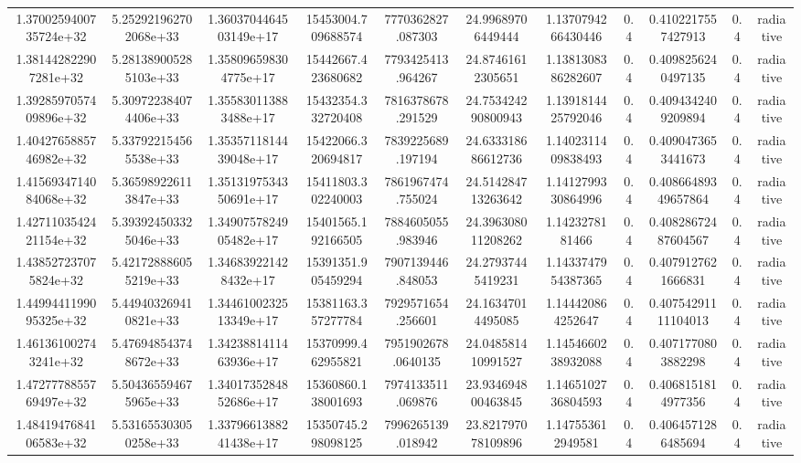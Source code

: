\begin{table}
\begin{tabular}{ccccccccccc}
1.3700259400735724e+32 & 5.252921962702068e+33 & 1.3603704464503149e+17 & 15453004.709688574 & 7770362827.087303 & 24.99689706449444 & 1.1370794266430446 & 0.4 & 0.4102217557427913 & 0.4 & radiative \\
1.381442822907281e+32 & 5.281389005285103e+33 & 1.358096598304775e+17 & 15442667.423680682 & 7793425413.964267 & 24.87461612305651 & 1.1381308386282607 & 0.4 & 0.4098256240497135 & 0.4 & radiative \\
1.3928597057409896e+32 & 5.309722384074406e+33 & 1.355830113883488e+17 & 15432354.332720408 & 7816378678.291529 & 24.753424290800943 & 1.1391814425792046 & 0.4 & 0.4094342409209894 & 0.4 & radiative \\
1.4042765885746982e+32 & 5.337922154565538e+33 & 1.3535711814439048e+17 & 15422066.320694817 & 7839225689.197194 & 24.633318686612736 & 1.1402311409838493 & 0.4 & 0.4090473653441673 & 0.4 & radiative \\
1.4156934714084068e+32 & 5.365989226113847e+33 & 1.3513197534350691e+17 & 15411803.302240003 & 7861967474.755024 & 24.514284713263642 & 1.1412799330864996 & 0.4 & 0.40866489349657864 & 0.4 & radiative \\
1.4271103542421154e+32 & 5.393924503325046e+33 & 1.3490757824905482e+17 & 15401565.192166505 & 7884605055.983946 & 24.396308011208262 & 1.1423278181466 & 0.4 & 0.40828672487604567 & 0.4 & radiative \\
1.438527237075824e+32 & 5.421728886055219e+33 & 1.346839221428432e+17 & 15391351.905459294 & 7907139446.848053 & 24.27937445419231 & 1.1433747954387365 & 0.4 & 0.4079127621666831 & 0.4 & radiative \\
1.4499441199095325e+32 & 5.449403269410821e+33 & 1.3446100232513349e+17 & 15381163.357277784 & 7929571654.256601 & 24.16347014495085 & 1.144420864252647 & 0.4 & 0.40754291111104013 & 0.4 & radiative \\
1.461361002743241e+32 & 5.476948543748672e+33 & 1.3423881411463936e+17 & 15370999.462955821 & 7951902678.0640135 & 24.048581410991527 & 1.1454660238932088 & 0.4 & 0.4071770803882298 & 0.4 & radiative \\
1.4727778855769497e+32 & 5.504365594675965e+33 & 1.3401735284852686e+17 & 15360860.138001693 & 7974133511.069876 & 23.934694800463845 & 1.1465102736804593 & 0.4 & 0.4068151814977356 & 0.4 & radiative \\
1.4841947684106583e+32 & 5.531655303050258e+33 & 1.3379661388241438e+17 & 15350745.298098125 & 7996265139.018942 & 23.821797078109896 & 1.147553612949581 & 0.4 & 0.4064571286485694 & 0.4 & radiative \\

\end{tabular}
\end{table}

